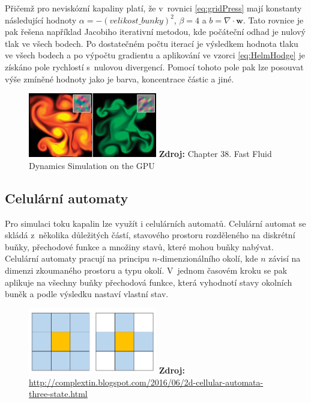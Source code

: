 Přičemž pro neviskózní kapaliny platí, že v~rovnici \ref{eq:gridPress} mají konstanty následující hodnoty $\alpha = -( velikost\_bunky )^2$, $\beta = 4$ a $b = \nabla \cdot \mathbf{w}$. Tato rovnice je pak řešena například Jacobiho iterativní metodou, kde počáteční odhad je nulový tlak ve všech bodech. Po dostatečném počtu iterací je výsledkem hodnota tlaku ve všech bodech a po výpočtu gradientu a aplikování ve vzorci \ref{eq:HelmHodge} je získáno pole rychlostí s~nulovou divergencí. Pomocí tohoto pole pak lze posouvat výše zmíněné hodnoty jako je barva, koncentrace částic a jiné.
\cite{GPUGemsGridFLuid}

\begin{figure}[hbt]
	\centering
	\captionsetup{justification=centering}
	\includegraphics[width=0.5\textwidth]{obrazky-figures/GridFluid.jpg}
	\textbf{Zdroj: } Chapter 38. Fast Fluid Dynamics Simulation on the GPU \cite{GPUGemsGridFLuid}
	\label{fig:EulerFluid}
\end{figure}

\subsection{Celulární automaty}
Pro simulaci toku kapalin lze využít i celulárních automatů. Celulární automat se skládá z~několika důležitých částí, stavového prostoru rozděleného na diskrétní buňky, přechodové funkce a množiny stavů, které mohou buňky nabývat. Celulární automaty pracují na principu $n$-dimenzionálního okolí, kde $n$ závisí na dimenzi zkoumaného prostoru a typu okolí. V~jednom časovém kroku se pak aplikuje na všechny buňky přechodová funkce, která vyhodnotí stavy okolních buněk a podle výsledku nastaví vlastní stav.

\begin{figure}[hbt]
	\centering
	\captionsetup{justification=centering}
	\includegraphics[width=0.5\textwidth]{obrazky-figures/Neighborhood.png}
	\textbf{Zdroj: } \url{http://complextin.blogspot.com/2016/06/2d-cellular-automata-three-state.html}
	\label{fig:neighbours}
\end{figure}

